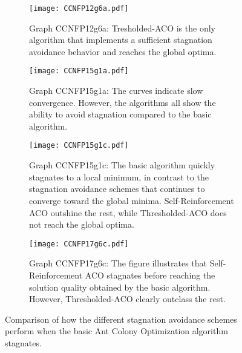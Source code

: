\begin{figure}[htp] %
\graphicspath{{chapters/chapter5/images/graphs/}}

\begin{subfigure}[t]{0.5\textwidth}
  \centering
  \texttt{[image: CCNFP12g6a.pdf]}
  \caption{Graph CCNFP12g6a: Tresholded-ACO is the only algorithm that implements a sufficient stagnation avoidance behavior and reaches the global optima.}\label{fig:stagnation_avoidance_effeciency_fig1}
\end{subfigure}
\quad
\begin{subfigure}[t]{0.5\textwidth}
  \centering
  \texttt{[image: CCNFP15g1a.pdf]}
  \caption{Graph CCNFP15g1a: The curves indicate slow convergence. However, the algorithms all show the ability to avoid stagnation compared to the basic algorithm. }\label{fig:stagnation_avoidance_effeciency_fig2}
\end{subfigure}

\begin{subfigure}[t]{0.5\textwidth}
  \centering
  \texttt{[image: CCNFP15g1c.pdf]}
  \caption{Graph CCNFP15g1c: The basic algorithm quickly stagnates to a local minimum, in contrast to the stagnation avoidance schemes that continues to converge toward the global minima. Self-Reinforcement ACO outshine the rest, while Thresholded-ACO does not reach the global optima.}\label{fig:stagnation_avoidance_effeciency_fig3}
\end{subfigure}
\quad
\begin{subfigure}[t]{0.5\textwidth}
  \centering
  \texttt{[image: CCNFP17g6c.pdf]}
  \caption{Graph CCNFP17g6c: The figure illustrates that Self-Reinforcement ACO stagnates before reaching the solution quality obtained by the basic algorithm. However, Thresholded-ACO clearly outclass the rest.}\label{fig:stagnation_avoidance_effeciency_fig4}
\end{subfigure}


\caption{Comparison of how the different stagnation avoidance schemes perform when the basic Ant Colony Optimization algorithm stagnates.}\label{fig:stagnation_avoidance_effeciency}
\end{figure}